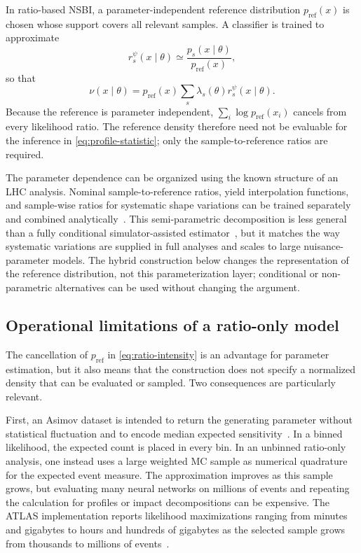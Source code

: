 \documentclass[
  aps,
  prd,
  superscriptaddress,
  nofootinbib,
  longbibliography,
  12pt
]{revtex4-2}
\newcommand{\pRef}{p_{\mathrm{ref}}}
\begin{document}
In ratio-based NSBI, a parameter-independent reference distribution $\pRef(x)$ is chosen whose support covers all relevant samples.  A classifier is trained to approximate
\begin{equation}
  r_s^\psi(x\mid\theta)
  \simeq \frac{p_s(x\mid\theta)}{\pRef(x)},
  \label{eq:process-reference-ratio}
\end{equation}
so that
\begin{equation}
  \nu(x\mid\theta)
  =\pRef(x)\sum_s\lambda_s(\theta)r_s^\psi(x\mid\theta).
  \label{eq:ratio-intensity}
\end{equation}
Because the reference is parameter independent, $\sum_i\log\pRef(x_i)$ cancels from every likelihood ratio.  The reference density therefore need not be evaluable for the inference in \cref{eq:profile-statistic}; only the sample-to-reference ratios are required.

The parameter dependence can be organized using the known structure of an LHC analysis.  Nominal sample-to-reference ratios, yield interpolation functions, and sample-wise ratios for systematic shape variations can be trained separately and combined analytically~\cite{ATLAS:2024rpr,Sandesara:2026lectures}.  This semi-parametric decomposition is less general than a fully conditional simulator-assisted estimator~\cite{Brehmer:2018eca,Brehmer:2018hga}, but it matches the way systematic variations are supplied in full analyses and scales to large nuisance-parameter models.  The hybrid construction below changes the representation of the reference distribution, not this parameterization layer; conditional or non-parametric alternatives can be used without changing the argument.

\subsection{Operational limitations of a ratio-only model}
\label{sec:ratio-limitations}

The cancellation of $\pRef$ in \cref{eq:ratio-intensity} is an advantage for parameter estimation, but it also means that the construction does not specify a normalized density that can be evaluated or sampled.  Two consequences are particularly relevant.

First, an Asimov dataset is intended to return the generating parameter without statistical fluctuation and to encode median expected sensitivity~\cite{Cowan:2010js}.  In a binned likelihood, the expected count is placed in every bin.  In an unbinned ratio-only analysis, one instead uses a large weighted MC sample as numerical quadrature for the expected event measure.  The approximation improves as this sample grows, but evaluating many neural networks on millions of events and repeating the calculation for profiles or impact decompositions can be expensive.  The ATLAS implementation reports likelihood maximizations ranging from minutes and gigabytes to hours and hundreds of gigabytes as the selected sample grows from thousands to millions of events~\cite{ATLAS:2024rpr}.
\end{document}
